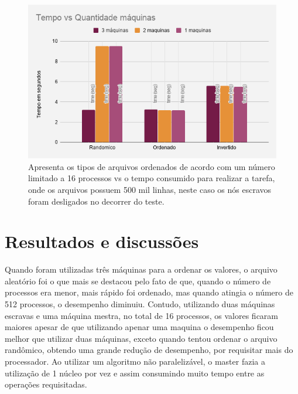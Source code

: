 \documentclass[12pt]{article}
\begin{document}
    \begin{figure}[!htb]
         \centering
         \includegraphics[scale=0.5]{chart/chart4.png}
         \caption{Apresenta os tipos de arquivos ordenados de acordo com um número limitado a 16 processos
         vs o tempo consumido para realizar a tarefa, onde os arquivos possuem 500 mil linhas, neste caso os nós escravos foram desligados no decorrer do teste.}
         \label{img:chart4}
    \end{figure}
   
    
    


\section{Resultados e discussões}

Quando foram utilizadas três máquinas para a ordenar os valores, o arquivo aleatório foi o que mais se destacou pelo fato de que, quando o número de processos era menor, mais rápido foi ordenado, mas quando atingia o número de 512 processos, o desempenho diminuiu. Contudo, utilizando duas máquinas escravas e uma máquina mestra, no total de 16 processos, os valores ficaram maiores apesar de que utilizando apenar uma maquina o desempenho ficou melhor que utilizar duas máquinas, exceto quando tentou ordenar o arquivo randômico, obtendo uma grande redução de desempenho, por requisitar mais do processador. Ao utilizar um algoritmo não paralelizável, o master fazia a utilização de 1 núcleo por vez e assim consumindo muito tempo entre as operações requisitadas.
\end{document}
